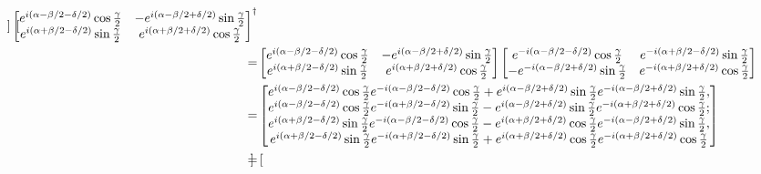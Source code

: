\documentclass[en]{sol-man}
\begin{document}
\begin{sol}
\begin{align}
\begin{bmatrix}
            \end{bmatrix}\begin{bmatrix}
                e^{i(\alpha-\beta/2-\delta/2)}\cos\frac{\gamma}{2}&-e^{i(\alpha-\beta/2+\delta/2)}\sin\frac{\gamma}{2}\\
                e^{i(\alpha+\beta/2-\delta/2)}\sin\frac{\gamma}{2}&e^{i(\alpha+\beta/2+\delta/2)}\cos\frac{\gamma}{2}
            \end{bmatrix}^{\dagger}\\
            \notag=&\begin{bmatrix}
                e^{i(\alpha-\beta/2-\delta/2)}\cos\frac{\gamma}{2}&-e^{i(\alpha-\beta/2+\delta/2)}\sin\frac{\gamma}{2}\\
                e^{i(\alpha+\beta/2-\delta/2)}\sin\frac{\gamma}{2}&e^{i(\alpha+\beta/2+\delta/2)}\cos\frac{\gamma}{2}
            \end{bmatrix}\begin{bmatrix}
                e^{-i(\alpha-\beta/2-\delta/2)}\cos\frac{\gamma}{2}&e^{-i(\alpha+\beta/2-\delta/2)}\sin\frac{\gamma}{2}\\
                -e^{-i(\alpha-\beta/2+\delta/2)}\sin\frac{\gamma}{2}&e^{-i(\alpha+\beta/2+\delta/2)}\cos\frac{\gamma}{2}
            \end{bmatrix}\\
            \notag=&\begin{bmatrix}
                e^{i(\alpha-\beta/2-\delta/2)}\cos\frac{\gamma}{2}e^{-i(\alpha-\beta/2-\delta/2)}\cos\frac{\gamma}{2}+e^{i(\alpha-\beta/2+\delta/2)}\sin\frac{\gamma}{2}e^{-i(\alpha-\beta/2+\delta/2)}\sin\frac{\gamma}{2},\\
                e^{i(\alpha-\beta/2-\delta/2)}\cos\frac{\gamma}{2}e^{-i(\alpha+\beta/2-\delta/2)}\sin\frac{\gamma}{2}-e^{i(\alpha-\beta/2+\delta/2)}\sin\frac{\gamma}{2}e^{-i(\alpha+\beta/2+\delta/2)}\cos\frac{\gamma}{2};\\
                e^{i(\alpha+\beta/2-\delta/2)}\sin\frac{\gamma}{2}e^{-i(\alpha-\beta/2-\delta/2)}\cos\frac{\gamma}{2}-e^{i(\alpha+\beta/2+\delta/2)}\cos\frac{\gamma}{2}e^{-i(\alpha-\beta/2+\delta/2)}\sin\frac{\gamma}{2},\\
                e^{i(\alpha+\beta/2-\delta/2)}\sin\frac{\gamma}{2}e^{-i(\alpha+\beta/2-\delta/2)}\sin\frac{\gamma}{2}+e^{i(\alpha+\beta/2+\delta/2)}\cos\frac{\gamma}{2}e^{-i(\alpha+\beta/2+\delta/2)}\cos\frac{\gamma}{2}
            \end{bmatrix}\\
            =&\begin{bmatrix}

\end{bmatrix}
\end{align}
\end{sol}
\end{document}

